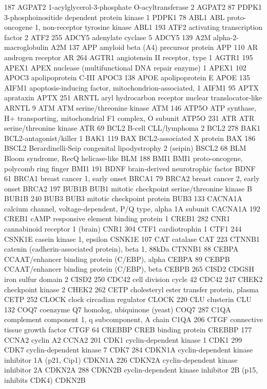 187	AGPAT2	1-acylglycerol-3-phosphate O-acyltransferase 2	AGPAT2
87	PDPK1	3-phosphoinositide dependent protein kinase 1	PDPK1
78	ABL1	ABL proto-oncogene 1, non-receptor tyrosine kinase	ABL1
193	ATF2	activating transcription factor 2	ATF2
255	ADCY5	adenylate cyclase 5	ADCY5
139	A2M	alpha-2-macroglobulin	A2M
137	APP	amyloid beta (A4) precursor protein	APP
110	AR	androgen receptor	AR
264	AGTR1	angiotensin II receptor, type 1	AGTR1
195	APEX1	APEX nuclease (multifunctional DNA repair enzyme) 1	APEX1
102	APOC3	apolipoprotein C-III	APOC3
138	APOE	apolipoprotein E	APOE
135	AIFM1	apoptosis-inducing factor, mitochondrion-associated, 1	AIFM1
95	APTX	aprataxin	APTX
251	ARNTL	aryl hydrocarbon receptor nuclear translocator-like	ARNTL
9	ATM	ATM serine/threonine kinase	ATM
146	ATP5O	ATP synthase, H+ transporting, mitochondrial F1 complex, O subunit	ATP5O
231	ATR	ATR serine/threonine kinase	ATR
69	BCL2	B-cell CLL/lymphoma 2	BCL2
278	BAK1	BCL2-antagonist/killer 1	BAK1
119	BAX	BCL2-associated X protein	BAX
186	BSCL2	Berardinelli-Seip congenital lipodystrophy 2 (seipin)	BSCL2
68	BLM	Bloom syndrome, RecQ helicase-like	BLM
188	BMI1	BMI1 proto-oncogene, polycomb ring finger	BMI1
191	BDNF	brain-derived neurotrophic factor	BDNF
61	BRCA1	breast cancer 1, early onset	BRCA1
79	BRCA2	breast cancer 2, early onset	BRCA2
197	BUB1B	BUB1 mitotic checkpoint serine/threonine kinase B	BUB1B
240	BUB3	BUB3 mitotic checkpoint protein	BUB3
133	CACNA1A	calcium channel, voltage-dependent, P/Q type, alpha 1A subunit	CACNA1A
192	CREB1	cAMP responsive element binding protein 1	CREB1
282	CNR1	cannabinoid receptor 1 (brain)	CNR1
304	CTF1	cardiotrophin 1	CTF1
244	CSNK1E	casein kinase 1, epsilon	CSNK1E
107	CAT	catalase	CAT
223	CTNNB1	catenin (cadherin-associated protein), beta 1, 88kDa	CTNNB1
88	CEBPA	CCAAT/enhancer binding protein (C/EBP), alpha	CEBPA
89	CEBPB	CCAAT/enhancer binding protein (C/EBP), beta	CEBPB
265	CISD2	CDGSH iron sulfur domain 2	CISD2
250	CDC42	cell division cycle 42	CDC42
247	CHEK2	checkpoint kinase 2	CHEK2
262	CETP	cholesteryl ester transfer protein, plasma	CETP
252	CLOCK	clock circadian regulator	CLOCK
220	CLU	clusterin	CLU
132	COQ7	coenzyme Q7 homolog, ubiquinone (yeast)	COQ7
287	C1QA	complement component 1, q subcomponent, A chain	C1QA
206	CTGF	connective tissue growth factor	CTGF
64	CREBBP	CREB binding protein	CREBBP
177	CCNA2	cyclin A2	CCNA2
201	CDK1	cyclin-dependent kinase 1	CDK1
299	CDK7	cyclin-dependent kinase 7	CDK7
284	CDKN1A	cyclin-dependent kinase inhibitor 1A (p21, Cip1)	CDKN1A
226	CDKN2A	cyclin-dependent kinase inhibitor 2A	CDKN2A
288	CDKN2B	cyclin-dependent kinase inhibitor 2B (p15, inhibits CDK4)	CDKN2B
